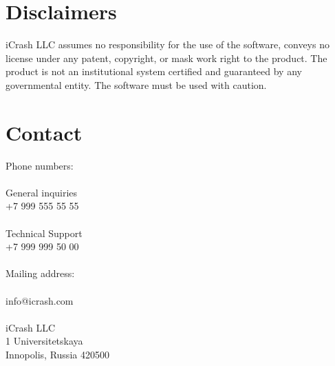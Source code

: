 \section{Disclaimers}

iCrash LLC assumes no responsibility for the use of the software, conveys no
license under any patent, copyright, or mask work right to the product.
The product is not an institutional system certified and guaranteed by any
governmental entity.
The software must be used with caution.

\section{Contact}
Phone numbers:\\
\\
General inquiries\\
+7 999 555 55 55\\
\\
Technical Support\\
+7 999 999 50 00\\
\\
Mailing address:\\
\\
info@icrash.com\\
\\
iCrash LLC\\
1 Universitetskaya\\
Innopolis, Russia 420500